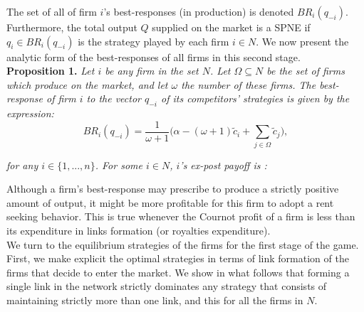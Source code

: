 \documentclass{article}
\begin{document}
The set of all of firm $i$'s best-responses (in production) is denoted $BR_i(q_{-i})$. Furthermore, the total output $Q$ supplied on the market is a SPNE if $q_i\in BR_i(q_{-i})$ is the strategy played by each firm $i\in N$. We now present the analytic form of the best-responses of all firms in this second stage.\\

\textbf{Proposition 1.} \textit{Let $i$ be any firm in the set $N$. Let $\Omega\subseteq N$ be the set of firms which produce on the market, and let $\omega$ the number of these firms. The best-response of firm $i$ to the vector $q_{-i}$ of its competitors' strategies is given by the expression: }
\begin{equation}
BR_i(q_{-i}) = \dfrac{1}{\omega+1}\Big(\alpha - (\omega+1)\tilde{c}_i + \sum \limits_{ j\in \Omega}\tilde{c}_j \Big), \label{BR}
\end{equation}

\textit{for any $i \in \{1,...,n\} $. For some $i\in N$, $i$'s ex-post payoff is :}


\indent Although a firm's best-response may prescribe to produce a strictly positive amount of output, it might be more profitable for this firm to adopt a rent seeking behavior. This is true whenever the Cournot profit of a firm is less than its expenditure in links formation (or royalties expenditure). \\

\indent We turn to the equilibrium strategies of the firms for the first stage of the game. First, we make explicit the optimal strategies in terms of link formation of the firms that decide to enter the market. We show in what follows that forming a single link in the network strictly dominates any strategy that consists of maintaining strictly more than one link, and this for all the firms in $N$. \\
\end{document}

